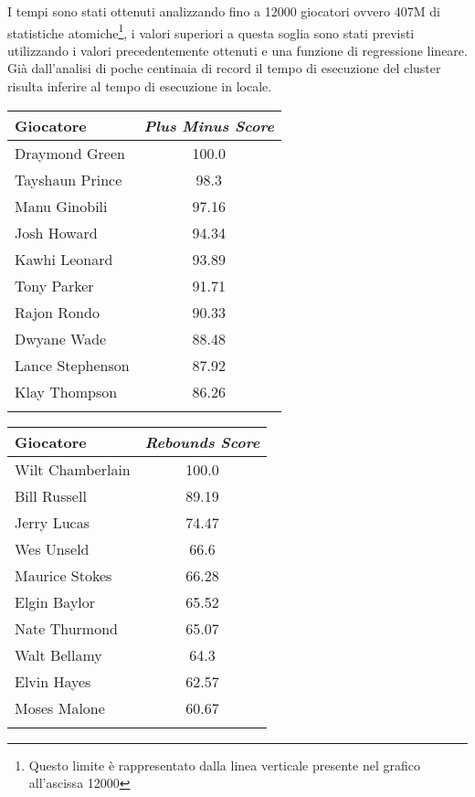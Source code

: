 \documentclass[10pt,a4paper,twocolumn]{article}
\begin{document}
I tempi sono stati ottenuti analizzando fino a 12000 giocatori ovvero 407M di statistiche atomiche\footnote{Questo limite è rappresentato dalla linea verticale presente nel grafico all'ascissa 12000}, i valori superiori a questa soglia sono stati previsti utilizzando i valori precedentemente ottenuti e una funzione di regressione lineare. Già dall'analisi di poche centinaia di record il tempo di esecuzione del cluster risulta inferire al tempo di esecuzione in locale.

\begin{table*}[t]
	\parbox{.45\linewidth}{
		\begin{tabular}{lc}
			Giocatore & \textit{Plus Minus Score}  \\
			\hline
			Draymond Green & 100.0\\
			Tayshaun Prince & 98.3\\
			Manu Ginobili & 97.16\\
			Josh Howard & 94.34\\
			Kawhi Leonard & 93.89\\
			Tony Parker & 91.71\\
			Rajon Rondo & 90.33\\
			Dwyane Wade & 88.48\\
			Lance Stephenson & 87.92\\
			Klay Thompson & 86.26\\
			&\\
		\end{tabular}
	}
	\quad
	\hspace{20pt}
	\parbox{.45\linewidth}{
		\begin{tabular}{lc}
			Giocatore & \textit{Rebounds Score}  \\
			\hline
			Wilt Chamberlain & 100.0\\
			Bill Russell & 89.19\\
			Jerry Lucas & 74.47\\
			Wes Unseld & 66.6\\
			Maurice Stokes & 66.28\\
			Elgin Baylor & 65.52\\
			Nate Thurmond & 65.07\\
			Walt Bellamy & 64.3\\
			Elvin Hayes & 62.57\\
			Moses Malone & 60.67\\
			&\\
			
		\end{tabular}
	}
	

\end{table*}
\end{document}
